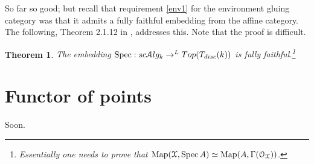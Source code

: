 \documentclass[10pt,a4paper,reqno,oneside]{book} %
\theoremstyle{plain}
\newtheorem{thm}{Theorem}[section]
\theoremstyle{definition}
\theoremstyle{remark}
\numberwithin{equation}{section}
\begin{document}
So far so good; but recall that requirement \ref{env1} for the environment gluing category was that it admits a fully
faithful embedding from the affine category. The following, Theorem 2.1.12 in \cite{DAG-V}, addresses this. Note that
the proof is difficult.

\begin{thm}
The embedding $\operatorname{Spec} : sc\mathcal A lg_k \to ^L Top(T_{disc}(k))$ is fully faithful.\footnote{Essentially one needs to prove that
$\operatorname{Map}(\mathcal{X}, \operatorname{Spec} A) \simeq \operatorname{Map}(A, \Gamma(\mathcal{O}_{\mathcal{X}}))$.}
\end{thm}



\section{Functor of points}
Soon.





\end{document}
